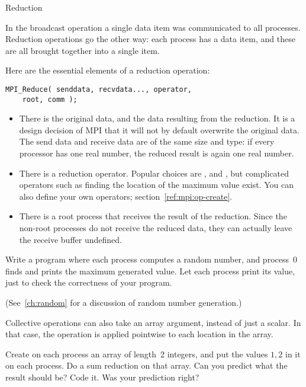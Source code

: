  {Reduction}

In the broadcast operation a single data item was communicated to all
processes. Reduction operations go the other way: each process has a
data item, and these are all brought together into a single item.

Here are the essential elements of a reduction operation:
\begin{verbatim}
MPI_Reduce( senddata, recvdata..., operator,
    root, comm ); 
\end{verbatim}
\begin{itemize}
\item There is the original data, and the data resulting from the
  reduction. It is a design decision of MPI that it will not by
  default overwrite the original data. The send data and receive data
  are of the same size and type: if every processor has one real
  number, the reduced result is again one real number.
\item There is a reduction operator. Popular choices are
  ,  and
  , but complicated operators such as finding
  the location of the maximum value exist. You can also define your
  own operators; section~\ref{ref:mpi:op-create}.
\item There is a root process that receives the result of the
  reduction. Since the non-root processes do not receive the reduced
  data, they can actually leave the receive buffer undefined.
\end{itemize}



\begin{exercise}
  \label{ex:randommax}
  Write a program where each process computes a random number, and process~0
  finds and prints the maximum generated value. Let each process print its value,
  just to check the correctness of your program.
\begin{book}
  (See~\ref{ch:random} for a discussion of random number generation.)
\end{book}
\end{exercise}

Collective operations can also take an array argument, instead of just a scalar.
In that case, the operation is applied pointwise to each location in the array.

\begin{exercise}
  \label{ex:randomcoord}
  Create on each process an array of length~2 integers, and put the
  values $1,2$ in it on each process. Do a sum reduction on that
  array. Can you predict what the result should be?  Code it. Was your
  prediction right?
\end{exercise}

